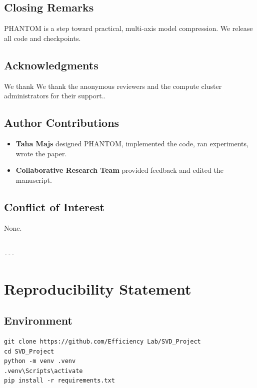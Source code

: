 \subsection{Closing Remarks}

PHANTOM is a step toward practical, multi-axis model compression. We release 
all code and checkpoints.

\subsection{Acknowledgments}

We thank We thank the anonymous reviewers and the compute cluster administrators for their support..

\subsection{Author Contributions}

\begin{itemize}
\item \textbf{Taha Majs} designed PHANTOM, implemented the code, ran experiments,
  wrote the paper.
\item \textbf{Collaborative Research Team} provided feedback and edited the manuscript.

\end{itemize}
\subsection{Conflict of Interest}

None.
\begin{lstlisting}

---
\end{lstlisting}


\section{Reproducibility Statement}

\subsection{Environment}

\begin{lstlisting}
git clone https://github.com/Efficiency Lab/SVD_Project
cd SVD_Project
python -m venv .venv
.venv\Scripts\activate
pip install -r requirements.txt
\end{lstlisting}

